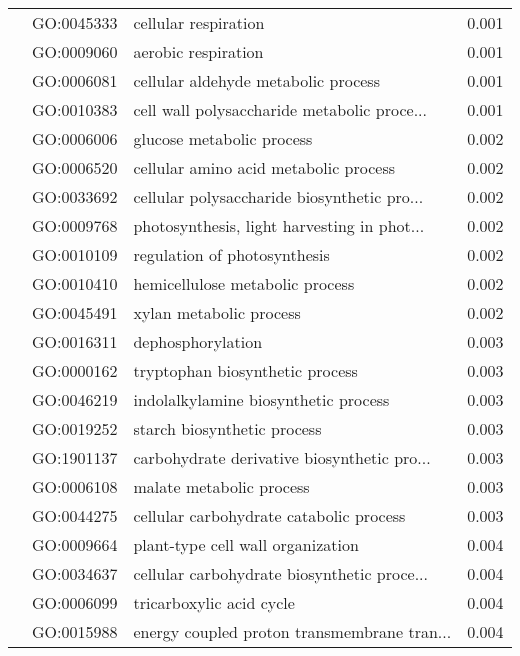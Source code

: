\begin{longtable}{lllr}
   & GO:0045333 &                         cellular respiration &         0.001 \\
   & GO:0009060 &                          aerobic respiration &         0.001 \\
   & GO:0006081 &          cellular aldehyde metabolic process &         0.001 \\
   & GO:0010383 &  cell wall polysaccharide metabolic proce... &         0.001 \\
   & GO:0006006 &                    glucose metabolic process &         0.002 \\
   & GO:0006520 &        cellular amino acid metabolic process &         0.002 \\
   & GO:0033692 &  cellular polysaccharide biosynthetic pro... &         0.002 \\
   & GO:0009768 &  photosynthesis, light harvesting in phot... &         0.002 \\
   & GO:0010109 &                 regulation of photosynthesis &         0.002 \\
   & GO:0010410 &              hemicellulose metabolic process &         0.002 \\
   & GO:0045491 &                      xylan metabolic process &         0.002 \\
   & GO:0016311 &                            dephosphorylation &         0.003 \\
   & GO:0000162 &              tryptophan biosynthetic process &         0.003 \\
   & GO:0046219 &         indolalkylamine biosynthetic process &         0.003 \\
   & GO:0019252 &                  starch biosynthetic process &         0.003 \\
   & GO:1901137 &  carbohydrate derivative biosynthetic pro... &         0.003 \\
   & GO:0006108 &                     malate metabolic process &         0.003 \\
   & GO:0044275 &      cellular carbohydrate catabolic process &         0.003 \\
   & GO:0009664 &            plant-type cell wall organization &         0.004 \\
   & GO:0034637 &  cellular carbohydrate biosynthetic proce... &         0.004 \\
   & GO:0006099 &                     tricarboxylic acid cycle &         0.004 \\
   & GO:0015988 &  energy coupled proton transmembrane tran... &         0.004 \\

\end{longtable}
